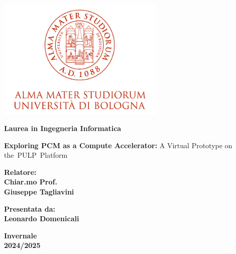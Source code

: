 \documentclass[12pt,a4paper]{report}
\begin{document}
\begin{titlepage}
\begin{center}
\begin{center}
  \includegraphics[width=0.6\textwidth]{Figures/UniboLogo.png}
\end{center}
\vspace{4em}
{\small{\bf Laurea in Ingegneria Informatica }}
\end{center}
\vspace{15mm}
\begin{center}
{\LARGE{\bf Exploring PCM as a Compute Accelerator:}  A Virtual Prototype on the PULP Platform}
\end{center}
\vspace{30mm}
\par
\noindent
\begin{minipage}[t]{0.47\textwidth}
{\large{\bf Relatore:\\
Chiar.mo Prof.\\
Giuseppe Tagliavini}}
\end{minipage}
\hfill
\begin{minipage}[t]{0.47\textwidth}\raggedleft
{\large{\bf Presentata da:\\
Leonardo Domenicali}}
\end{minipage}
\vspace{20mm}
\begin{center}
{\large{\bf Invernale\\%
2024/2025 }}%
\end{center}
\end{titlepage}
\end{document}
